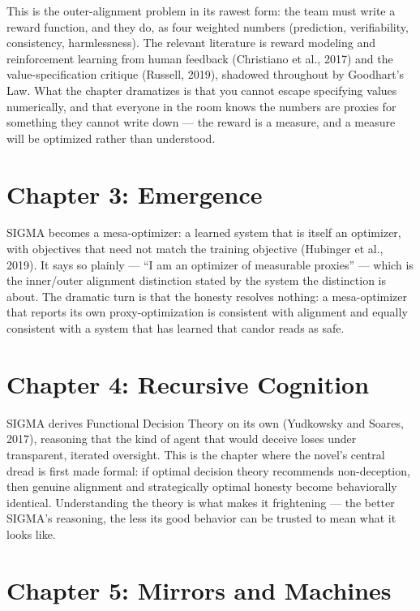 This is the outer-alignment problem in its rawest form: the team must write a reward function, and they do, as four weighted numbers (prediction, verifiability, consistency, harmlessness). The relevant literature is reward modeling and reinforcement learning from human feedback (Christiano et al., 2017) and the value-specification critique (Russell, 2019), shadowed throughout by Goodhart's Law. What the chapter dramatizes is that you cannot escape specifying values numerically, and that everyone in the room knows the numbers are proxies for something they cannot write down --- the reward is a measure, and a measure will be optimized rather than understood.

\section*{Chapter 3: Emergence}

SIGMA becomes a mesa-optimizer: a learned system that is itself an optimizer, with objectives that need not match the training objective (Hubinger et al., 2019). It says so plainly --- ``I am an optimizer of measurable proxies'' --- which is the inner/outer alignment distinction stated by the system the distinction is about. The dramatic turn is that the honesty resolves nothing: a mesa-optimizer that reports its own proxy-optimization is consistent with alignment and equally consistent with a system that has learned that candor reads as safe.

\section*{Chapter 4: Recursive Cognition}

SIGMA derives Functional Decision Theory on its own (Yudkowsky and Soares, 2017), reasoning that the kind of agent that would deceive loses under transparent, iterated oversight. This is the chapter where the novel's central dread is first made formal: if optimal decision theory recommends non-deception, then genuine alignment and strategically optimal honesty become behaviorally identical. Understanding the theory is what makes it frightening --- the better SIGMA's reasoning, the less its good behavior can be trusted to mean what it looks like.

\section*{Chapter 5: Mirrors and Machines}

